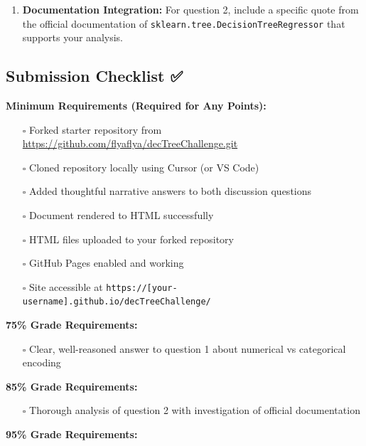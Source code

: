 \documentclass[
  letterpaper,
  DIV=11,
  numbers=noendperiod]{scrartcl}
\providecommand{\tightlist}{%
  \setlength{\itemsep}{0pt}\setlength{\parskip}{0pt}}
\begin{document}
\begin{enumerate}
\def\labelenumi{\arabic{enumi}.}
\setcounter{enumi}{3}
\tightlist
\item
  \textbf{Documentation Integration:} For question 2, include a specific
  quote from the official documentation of
  \texttt{sklearn.tree.DecisionTreeRegressor} that supports your
  analysis.
\end{enumerate}

\subsection{Submission Checklist ✅}\label{submission-checklist}

\textbf{Minimum Requirements (Required for Any Points):}

\begin{itemize}
\tightlist
\item[$\square$]
  Forked starter repository from
  \url{https://github.com/flyaflya/decTreeChallenge.git}
\item[$\square$]
  Cloned repository locally using Cursor (or VS Code)
\item[$\square$]
  Added thoughtful narrative answers to both discussion questions
\item[$\square$]
  Document rendered to HTML successfully
\item[$\square$]
  HTML files uploaded to your forked repository
\item[$\square$]
  GitHub Pages enabled and working
\item[$\square$]
  Site accessible at
  \texttt{https://{[}your-username{]}.github.io/decTreeChallenge/}
\end{itemize}

\textbf{75\% Grade Requirements:}

\begin{itemize}
\tightlist
\item[$\square$]
  Clear, well-reasoned answer to question 1 about numerical vs
  categorical encoding
\end{itemize}

\textbf{85\% Grade Requirements:}

\begin{itemize}
\tightlist
\item[$\square$]
  Thorough analysis of question 2 with investigation of official
  documentation
\end{itemize}

\textbf{95\% Grade Requirements:}
\end{document}

